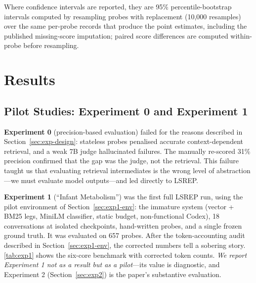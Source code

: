 \documentclass[10pt]{article}
\begin{document}
Where confidence intervals are reported, they are 95\% percentile-bootstrap intervals computed by resampling probes with replacement (10{,}000 resamples) over the same per-probe records that produce the point estimates, including the published missing-score imputation; paired score differences are computed within-probe before resampling.

\section{Results}
\label{sec:results}

\subsection{Pilot Studies: Experiment 0 and Experiment 1}
\label{sec:exp1}

\textbf{Experiment 0} (precision-based evaluation) failed for the reasons described in Section~\ref{sec:exp-design}: stateless probes penalised accurate context-dependent retrieval, and a weak 7B judge hallucinated failures. The manually re-scored 31\% precision confirmed that the gap was the judge, not the retrieval. This failure taught us that evaluating retrieval intermediates is the wrong level of abstraction---we must evaluate model outputs---and led directly to LSREP.

\textbf{Experiment 1} (``Infant Metabolism'') was the first full LSREP run, using the pilot environment of Section~\ref{sec:exp1-env}: the immature system (vector + BM25 legs, MiniLM classifier, static budget, non-functional Codex), 18 conversations at isolated checkpoints, hand-written probes, and a single frozen ground truth. It was evaluated on 657 probes. After the token-accounting audit described in Section~\ref{sec:exp1-env}, the corrected numbers tell a sobering story. \cref{tab:exp1} shows the six-core benchmark with corrected token counts. \emph{We report Experiment 1 not as a result but as a pilot}---its value is diagnostic, and Experiment 2 (Section~\ref{sec:exp2}) is the paper's substantive evaluation.
\end{document}
